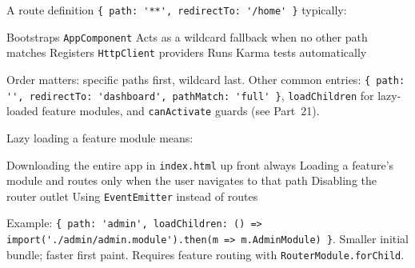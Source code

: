 \question[4]
A route definition \lstinline[style=tsinline]|{ path: '**', redirectTo: '/home' }| typically:
\begin{choices}
  \choice Bootstraps \texttt{AppComponent}
  \CorrectChoice Acts as a wildcard fallback when no other path matches
  \choice Registers \texttt{HttpClient} providers
  \choice Runs Karma tests automatically
\end{choices}
\begin{solution}
  Order matters: specific paths first, wildcard last. Other common entries: \lstinline[style=tsinline]|{ path: '', redirectTo: 'dashboard', pathMatch: 'full' }|, \lstinline[style=tsinline]|loadChildren| for lazy-loaded feature modules, and \lstinline[style=tsinline]|canActivate| guards (see Part~21).
\end{solution}

\question[4]
Lazy loading a feature module means:
\begin{choices}
  \choice Downloading the entire app in \texttt{index.html} up front always
  \CorrectChoice Loading a feature's module and routes only when the user navigates to that path
  \choice Disabling the router outlet
  \choice Using \lstinline[style=tsinline]|EventEmitter| instead of routes
\end{choices}
\begin{solution}
  Example: \lstinline[style=tsinline]|{ path: 'admin', loadChildren: () => import('./admin/admin.module').then(m => m.AdminModule) }|. Smaller initial bundle; faster first paint. Requires feature routing with \lstinline[style=tsinline]|RouterModule.forChild|.
\end{solution}

